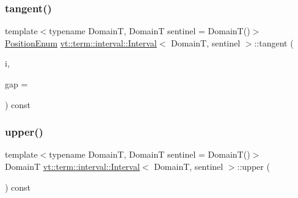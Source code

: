 \mbox{\label{structvt_1_1term_1_1interval_1_1_interval_a5558f4e833a84bed506f4fdc3a386071}} 
\subsubsection{\texorpdfstring{tangent()}{tangent()}}
{\footnotesize\ttfamily template$<$typename DomainT, DomainT sentinel = Domain\+T()$>$ \\
\hyperlink{structvt_1_1term_1_1interval_1_1_interval_adfdde0c1b12f536189432b168f6df6b3}{Position\+Enum} \hyperlink{structvt_1_1term_1_1interval_1_1_interval}{vt\+::term\+::interval\+::\+Interval}$<$ DomainT, sentinel $>$\+::tangent (\begin{DoxyParamCaption}\item[{\hyperlink{structvt_1_1term_1_1interval_1_1_interval_a183b53c7344a9aa51c026dfe71b57ad4}{Interval\+Type} const \&}]{i,  }\item[{DomainT}]{gap = {} }\end{DoxyParamCaption}) const\hspace{0.3cm}{\ttfamily [inline]}}

\mbox{\label{structvt_1_1term_1_1interval_1_1_interval_acbe552f15a1f22a89fa43bcba34fe27f}} 
\subsubsection{\texorpdfstring{upper()}{upper()}}
{\footnotesize\ttfamily template$<$typename DomainT, DomainT sentinel = Domain\+T()$>$ \\
DomainT \hyperlink{structvt_1_1term_1_1interval_1_1_interval}{vt\+::term\+::interval\+::\+Interval}$<$ DomainT, sentinel $>$\+::upper (\begin{DoxyParamCaption}{ }\end{DoxyParamCaption}) const\hspace{0.3cm}{\ttfamily [inline]}}

\mbox{\label{structvt_1_1term_1_1interval_1_1_interval_a563160f1b6e405bb9d11255a0b80d187}} 
